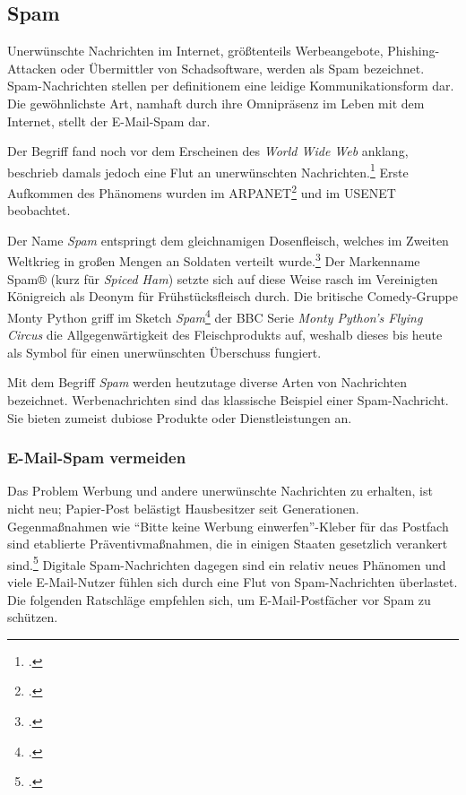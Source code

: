 \subsection{Spam} %
\label{sub:spam}
Unerwünschte Nachrichten im Internet, größtenteils Werbeangebote,
Phishing-Attacken oder Übermittler von Schadsoftware, werden als Spam
bezeichnet. Spam-Nachrichten stellen per definitionem eine leidige
Kommunikationsform dar. Die gewöhnlichste Art, namhaft durch ihre Omnipräsenz
im Leben mit dem Internet, stellt der E-Mail-Spam dar.

Der Begriff fand noch vor dem Erscheinen des \emph{World Wide Web} anklang,
beschrieb damals jedoch eine Flut an unerwünschten
Nachrichten.\footcite{originTermSpam} Erste Aufkommen des Phänomens wurden im
ARPANET\footcite{junkMailProblem} und im USENET beobachtet.

Der Name \emph{Spam} entspringt dem gleichnamigen Dosenfleisch, welches im
Zweiten Weltkrieg in großen Mengen an Soldaten verteilt
wurde.\footcite{lifeDuringSecondWW} Der Markenname Spam® (kurz für \emph{Spiced
Ham}) setzte sich auf diese Weise rasch im Vereinigten Königreich als Deonym
für Frühstücksfleisch durch. Die britische Comedy-Gruppe Monty Python griff im
Sketch \emph{Spam}\footcite{spamMontyPython} der BBC Serie \emph{Monty Python’s
Flying Circus} die Allgegenwärtigkeit des Fleischprodukts auf, weshalb dieses
bis heute als Symbol für einen unerwünschten Überschuss fungiert.

Mit dem Begriff \emph{Spam} werden heutzutage diverse Arten von Nachrichten
bezeichnet. Werbenachrichten sind das klassische Beispiel einer Spam-Nachricht.
Sie bieten zumeist dubiose Produkte oder Dienstleistungen an.

\subsubsection{E-Mail-Spam vermeiden}
\label{ssub:e-mail-spam-vermeiden}

Das Problem Werbung und andere unerwünschte Nachrichten zu erhalten, ist nicht
neu; Papier-Post belästigt Hausbesitzer seit Generationen. Gegenmaßnahmen wie
\enquote{Bitte keine Werbung einwerfen}-Kleber für das Postfach sind etablierte
Präventivmaßnahmen, die in einigen Staaten gesetzlich verankert
sind.\footcite{someReklameIllegal} Digitale Spam-Nachrichten dagegen sind ein
relativ neues Phänomen und viele E-Mail-Nutzer fühlen sich durch eine Flut von
Spam-Nachrichten überlastet. Die folgenden Ratschläge empfehlen sich, um
E-Mail-Postfächer vor Spam zu schützen.


